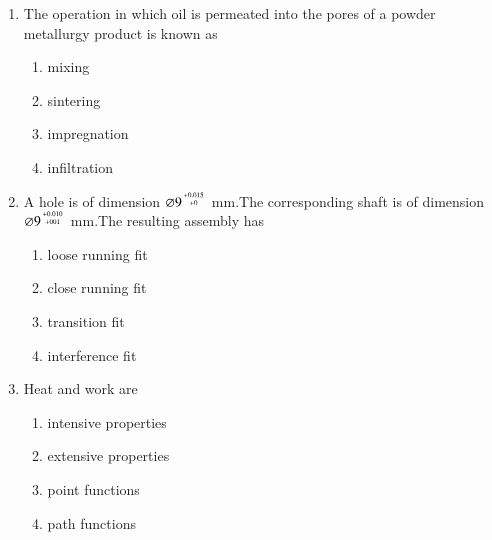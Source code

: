 \documentclass[journal]{IEEEtran}
\begin{document}
\begin{enumerate}
\begin{multicols}{2}
     \begin{enumerate}
         \item increase in coefficient of friction
         \item decrease in coefficient of friction
         \item decrease in roll radius
         \item increase in roll velocity
     \end{enumerate}
         \end{multicols}

     \item The operation in which oil is permeated into the pores of a powder metallurgy product is known as
         \begin{multicols}{2}

     \begin{enumerate}
         \item mixing
         \item sintering
         \item impregnation
         \item infiltration
     \end{enumerate}
         \end{multicols}

     \item A hole is of dimension  $\varnothing 9^{\genfrac{}{}{0pt}{}{+0.015}{+0}}$  mm.The corresponding shaft is of dimension $\varnothing 9^{\genfrac{}{}{0pt}{}{+0.010}{+001}}$ mm.The resulting assembly has
         \begin{multicols}{2}

     \begin{enumerate}
         \item loose running fit
         \item close running fit
         \item transition fit
         \item interference fit
         \end{enumerate}
             \end{multicols}

         \item Heat and work are
             \begin{multicols}{2}

         \begin{enumerate}
             \item intensive properties
             \item extensive properties
             \item point functions
             \item path functions
             \end{enumerate}
                 \end{multicols}


\end{enumerate}
\end{document}
